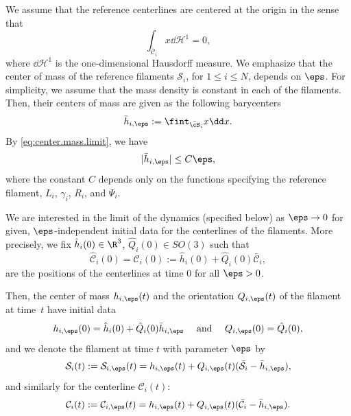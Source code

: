 We assume that the reference centerlines are centered at the origin in the sense that\vspace*{-3pt}
\begin{equation} \label{eq:center.mass.limit}
\int_{\bar {\mathcal C}_i} x \dd \mathcal H^1 = 0,
\end{equation}
where $\dd \mathcal{H}^1$ is the one-dimensional Hausdorff measure.
We emphasize that the center of mass of the reference filaments $\mathcal S_i$, for $ 1\leq i \leq N$, depends on $\eps$. For simplicity, we assume that the mass density is constant in each of the filaments. Then, their centers of mass are given as the following barycenters
\begin{equation}
\bar h_{i,\eps} := \fint_{\bar {\cS}_i} x \dd x.
\end{equation}
By \eqref{eq:center.mass.limit}, we have\vspace*{-3pt}
\begin{equation} \label{eq:center.mass.small}
|\bar h_{i,\eps}| \leq C \eps,
\end{equation}
where the constant $C$ depends only on the functions specifying the reference filament, \ie $L_i$, $\gamma_i$, $R_i$, and $\Psi_i$.

We are interested in the limit of the dynamics (specified below) as $\eps \to 0$ for given, $\eps$-independent initial data for the centerlines of the filaments. More precisely,
we fix $\hat h_i(0) \in \R^3$, $\hat Q_i(0) \in SO(3)$ such that
\begin{equation}
\label{dimathC}
\hat{\mathcal C}_i (0) = \mathcal C_i (0) := \hat h_i(0) + \hat Q_i(0) \bar {\mathcal C}_i,
\end{equation}
are the positions of the centerlines at time $0$ for all $\eps >0$.

Then, the center of mass $h_{i,\eps}(t)$ and the orientation $Q_{i,\eps}(t)$ of the filament at time~$t$ have initial data\vspace*{-3pt}
\begin{equation} \label{eq:initial.positions}
h_{i,\eps}(0) = \hat h_i(0) + {\hat Q_{i}(0)} \bar h_{i,\eps} \quad \text{ and } \quad Q_{i,\eps}(0) = \hat Q_i(0),
\end{equation}
and we denote the filament at time $t$ with parameter $\eps$ by\vspace*{-3pt}
\begin{equation} \label{def:Stourne}
\mathcal S_i(t) := \mathcal S_{i,\eps}(t) = h_{i,\eps}(t) + {Q_{i,\eps}}(t) (\bar {\mathcal S}_i - \bar h_{i,\eps}),
\end{equation}
and similarly for the centerline $\mathcal C_i(t)$:\vspace*{-3pt}
\begin{equation*}
\mathcal C_i(t) := \mathcal C_{i,\eps}(t) = h_{i,\eps}(t) + {Q_{i,\eps}}(t) (\bar {\mathcal C}_i - \bar h_{i,\eps}).
\end{equation*}

